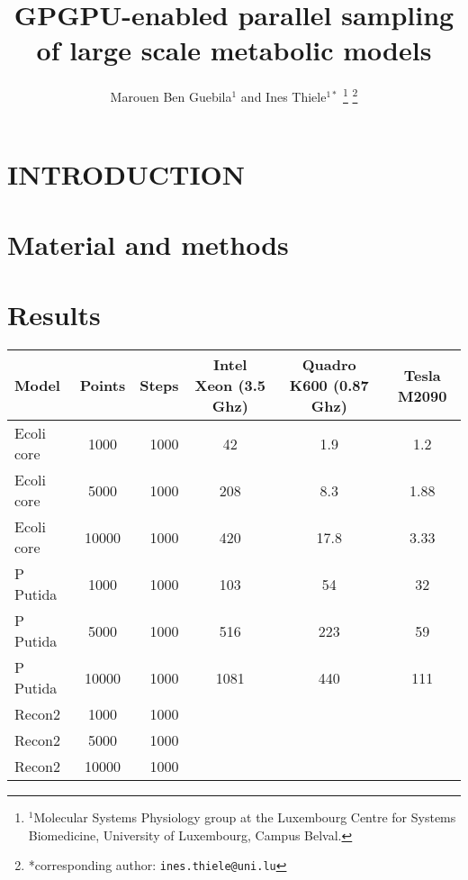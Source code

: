 \documentclass[letterpaper, 10 pt, conference]{ieeeconf}  %
\title{\LARGE \bf
GPGPU-enabled parallel sampling of large scale metabolic models
}
\author{Marouen Ben Guebila$^{1}$ and Ines Thiele$^{1*}$%
\thanks{$^{1}$Molecular Systems Physiology group at the Luxembourg Centre for Systems Biomedicine,
        University of Luxembourg, Campus Belval.
        }%
\thanks{*corresponding author: {\tt\small ines.thiele@uni.lu}}
}
\begin{document}
\maketitle
\thispagestyle{empty}
\pagestyle{empty}


\begin{abstract}



\end{abstract}


\section{INTRODUCTION}




\addtolength{\textheight}{-12cm}   %








\section{Material and methods}

\section{Results}
\begin{tabular}{|l|c|r|c|c|c|}
  \hline
  Model & Points & Steps & Intel Xeon (3.5 Ghz) & Quadro K600 (0.87 Ghz) & Tesla M2090 \\
  \hline
   Ecoli core& 1000& 1000& 42 & 1.9 & 1.2\\
   Ecoli core& 5000& 1000& 208 & 8.3 & 1.88\\
   Ecoli core& 10000& 1000& 420 & 17.8 & 3.33\\
   P Putida  & 1000& 1000& 103 & 54 & 32\\
   P Putida  & 5000& 1000& 516 &  223 & 59\\
   P Putida  & 10000& 1000& 1081 & 440 & 111\\
   Recon2  & 1000& 1000&  & & \\
   Recon2  & 5000& 1000&  & & \\
   Recon2  & 10000& 1000&  & & \\
  \hline
\end{tabular}
\end{document}

